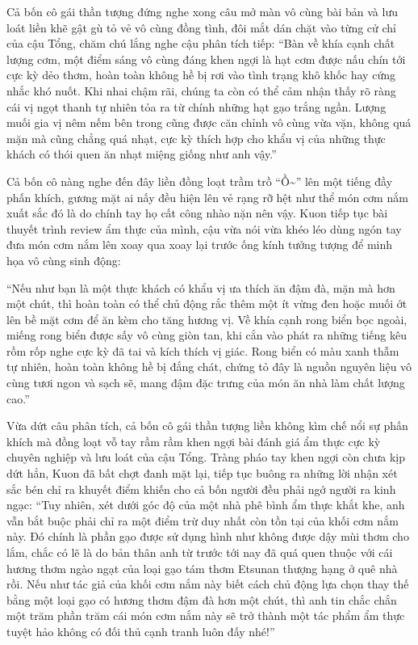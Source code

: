 \documentclass[../main.tex]{subfiles}
\begin{document}
Cả bốn cô gái thần tượng đứng nghe xong câu mở màn vô cùng bài bản và lưu loát liền khẽ gật gù tỏ vẻ vô cùng đồng tình, đôi mắt dán chặt vào từng cử chỉ của cậu Tổng, chăm chú lắng nghe cậu phân tích tiếp: ``Bàn về khía cạnh chất lượng cơm, một điểm sáng vô cùng đáng khen ngợi là hạt cơm được nấu chín tới cực kỳ dẻo thơm, hoàn toàn không hề bị rơi vào tình trạng khô khốc hay cứng nhắc khó nuốt. Khi nhai chậm rãi, chúng ta còn có thể cảm nhận thấy rõ ràng cái vị ngọt thanh tự nhiên tỏa ra từ chính những hạt gạo trắng ngần. Lượng muối gia vị nêm nếm bên trong cũng được căn chỉnh vô cùng vừa vặn, không quá mặn mà cũng chẳng quá nhạt, cực kỳ thích hợp cho khẩu vị của những thực khách có thói quen ăn nhạt miệng giống như anh vậy.''

Cả bốn cô nàng nghe đến đây liền đồng loạt trầm trồ ``Ồ\~{}'' lên một tiếng đầy phấn khích, gương mặt ai nấy đều hiện lên vẻ rạng rỡ hệt như thể món cơm nắm xuất sắc đó là do chính tay họ cất công nhào nặn nên vậy. Kuon tiếp tục bài thuyết trình review ẩm thực của mình, cậu vừa nói vừa khéo léo dùng ngón tay đưa món cơm nắm lên xoay qua xoay lại trước ống kính tưởng tượng để minh họa vô cùng sinh động:

``Nếu như bạn là một thực khách có khẩu vị ưa thích ăn đậm đà, mặn mà hơn một chút, thì hoàn toàn có thể chủ động rắc thêm một ít vừng đen hoặc muối ớt lên bề mặt cơm để ăn kèm cho tăng hương vị. Về khía cạnh rong biển bọc ngoài, miếng rong biển được sấy vô cùng giòn tan, khi cắn vào phát ra những tiếng kêu rồm rốp nghe cực kỳ đã tai và kích thích vị giác. Rong biển có màu xanh thẫm tự nhiên, hoàn toàn không hề bị đắng chát, chứng tỏ đây là nguồn nguyên liệu vô cùng tươi ngon và sạch sẽ, mang đậm đặc trưng của món ăn nhà làm chất lượng cao.''

Vừa dứt câu phân tích, cả bốn cô gái thần tượng liền không kìm chế nổi sự phấn khích mà đồng loạt vỗ tay rầm rầm khen ngợi bài đánh giá ẩm thực cực kỳ chuyên nghiệp và lưu loát của cậu Tổng. Tràng pháo tay khen ngợi còn chưa kịp dứt hẳn, Kuon đã bất chợt đanh mặt lại, tiếp tục buông ra những lời nhận xét sắc bén chỉ ra khuyết điểm khiến cho cả bốn người đều phải ngớ người ra kinh ngạc: ``Tuy nhiên, xét dưới góc độ của một nhà phê bình ẩm thực khắt khe, anh vẫn bắt buộc phải chỉ ra một điểm trừ duy nhất còn tồn tại của khối cơm nắm này. Đó chính là phần gạo được sử dụng hình như không được dậy mùi thơm cho lắm, chắc có lẽ là do bản thân anh từ trước tới nay đã quá quen thuộc với cái hương thơm ngào ngạt của loại gạo tám thơm Etsunan thượng hạng ở quê nhà rồi. Nếu như tác giả của khối cơm nắm này biết cách chủ động lựa chọn thay thế bằng một loại gạo có hương thơm đậm đà hơn một chút, thì anh tin chắc chắn một trăm phần trăm cái món cơm nắm này sẽ trở thành một tác phẩm ẩm thực tuyệt hảo không có đối thủ cạnh tranh luôn đấy nhé!''
\end{document}
